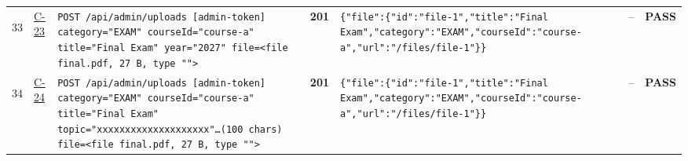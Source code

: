 \documentclass[10pt,a4paper]{article}
\begin{document}
\begin{landscape}
\begin{longtable}{@{}P{0.6cm}P{0.9cm}P{8.5cm}P{1.0cm}P{6.2cm}P{4.2cm}P{1.1cm}@{}}
\hypertarget{call33}{33} & \hyperlink{test-C-23}{C-23} & \texttt{POST /\allowbreak{}api/\allowbreak{}admin/\allowbreak{}uploads [admin-\allowbreak{}token] category=\allowbreak{}"\allowbreak{}EXAM"\allowbreak{} courseId=\allowbreak{}"\allowbreak{}course-\allowbreak{}a"\allowbreak{} title=\allowbreak{}"\allowbreak{}Final Exam"\allowbreak{} year=\allowbreak{}"\allowbreak{}2027"\allowbreak{} file=\allowbreak{}<file final.\allowbreak{}pdf,\allowbreak{} 27 B,\allowbreak{} type "\allowbreak{}"\allowbreak{}>} & \textcolor{passgreen}{\textbf{201}} & \texttt{\{"\allowbreak{}file"\allowbreak{}:\allowbreak{}\{"\allowbreak{}id"\allowbreak{}:\allowbreak{}"\allowbreak{}file-\allowbreak{}1"\allowbreak{},\allowbreak{}"\allowbreak{}title"\allowbreak{}:\allowbreak{}"\allowbreak{}Final Exam"\allowbreak{},\allowbreak{}"\allowbreak{}category"\allowbreak{}:\allowbreak{}"\allowbreak{}EXAM"\allowbreak{},\allowbreak{}"\allowbreak{}courseId"\allowbreak{}:\allowbreak{}"\allowbreak{}course-\allowbreak{}a"\allowbreak{},\allowbreak{}"\allowbreak{}url"\allowbreak{}:\allowbreak{}"\allowbreak{}/\allowbreak{}files/\allowbreak{}file-\allowbreak{}1"\allowbreak{}\}\}} & -- & \textcolor{passgreen}{\textbf{PASS}} \\
\hypertarget{call34}{34} & \hyperlink{test-C-24}{C-24} & \texttt{POST /\allowbreak{}api/\allowbreak{}admin/\allowbreak{}uploads [admin-\allowbreak{}token] category=\allowbreak{}"\allowbreak{}EXAM"\allowbreak{} courseId=\allowbreak{}"\allowbreak{}course-\allowbreak{}a"\allowbreak{} title=\allowbreak{}"\allowbreak{}Final Exam"\allowbreak{} topic=\allowbreak{}"\allowbreak{}xxxxxxxxxxxxxxxxxx\allowbreak{}xx"\allowbreak{}…(100 chars) file=\allowbreak{}<file final.\allowbreak{}pdf,\allowbreak{} 27 B,\allowbreak{} type "\allowbreak{}"\allowbreak{}>} & \textcolor{passgreen}{\textbf{201}} & \texttt{\{"\allowbreak{}file"\allowbreak{}:\allowbreak{}\{"\allowbreak{}id"\allowbreak{}:\allowbreak{}"\allowbreak{}file-\allowbreak{}1"\allowbreak{},\allowbreak{}"\allowbreak{}title"\allowbreak{}:\allowbreak{}"\allowbreak{}Final Exam"\allowbreak{},\allowbreak{}"\allowbreak{}category"\allowbreak{}:\allowbreak{}"\allowbreak{}EXAM"\allowbreak{},\allowbreak{}"\allowbreak{}courseId"\allowbreak{}:\allowbreak{}"\allowbreak{}course-\allowbreak{}a"\allowbreak{},\allowbreak{}"\allowbreak{}url"\allowbreak{}:\allowbreak{}"\allowbreak{}/\allowbreak{}files/\allowbreak{}file-\allowbreak{}1"\allowbreak{}\}\}} & -- & \textcolor{passgreen}{\textbf{PASS}} \\

\end{longtable}
\end{landscape}
\end{document}
